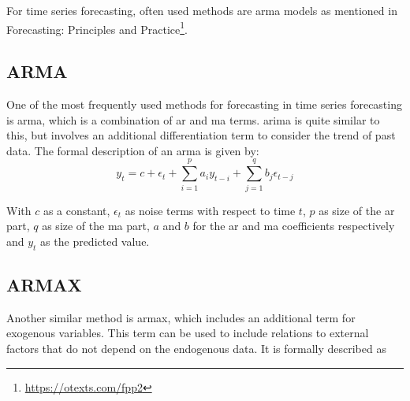 For time series forecasting, often used methods are \eg \gls{arma} models as mentioned in Forecasting: Principles and Practice\footnote{\url{https://otexts.com/fpp2}}.%

\subsection{ARMA}

One of the most frequently used methods for forecasting in time series forecasting is \gls{arma}, which is a combination of \gls{ar} and \gls{ma} terms. \gls{arima} is quite similar to this, but involves an additional differentiation term to consider the trend of past data. The formal description of an \gls{arma} is given by:\\

\begin{equation}
y_t = c+\epsilon_t+\sum_{i=1}^{p}a_iy_{t-i}+\sum_{j=1}^{q}b_j\epsilon_{t-j}
\label{eq:arma}
\end{equation}

With $c$ as a constant, $\epsilon_t$ as noise terms with respect to time $t$, $p$ as size of the \gls{ar} part, $q$ as size of the \gls{ma} part, $a$ and $b$ for the \gls{ar} and \gls{ma} coefficients respectively and $y_t$ as the predicted value.\\

\subsection{ARMAX}

Another similar method is \gls{armax}, which includes an additional term for exogenous variables. This term can be used to include relations to external factors that do not depend on the endogenous data. It is formally described as\\

